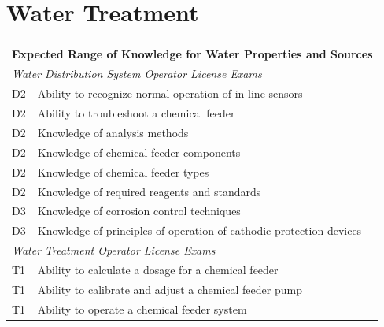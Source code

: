 \chapter{Water Treatment}

\begin{table}[H]
\begin{tabular}{| m{1cm} | m{15cm} |}
\hline
\multicolumn{2}{|l|}{\textbf{Expected   Range of Knowledge for Water Properties and Sources}}                                                                          \\ \hline
\multicolumn{2}{|l|}{\textit{Water   Distribution System Operator License Exams}}                                                                                      \\ \hline
D2 & Ability to   recognize normal operation of in-line sensors                                 \\ \hline
D2 & Ability to   troubleshoot a chemical feeder                                                \\ \hline
D2 & Knowledge of analysis   methods                                                            \\ \hline
D2 & Knowledge of chemical   feeder components                                                  \\ \hline
D2 & Knowledge of chemical   feeder types                                                       \\ \hline
D2 & Knowledge of required   reagents and standards                                             \\ \hline
D3 & Knowledge of   corrosion control techniques                                                \\ \hline
D3 & Knowledge of   principles of operation of cathodic protection devices                      \\ \hline
\multicolumn{2}{|l|}{\textit{Water   Treatment Operator License Exams}}                                                                                      \\ \hline
T1 & Ability to calculate   a dosage for a chemical feeder                                      \\ \hline
T1 & Ability to calibrate   and adjust a chemical feeder pump                                   \\ \hline
T1 & Ability to operate a   chemical feeder system                                              \\ \hline

\end{tabular}
\end{table}
